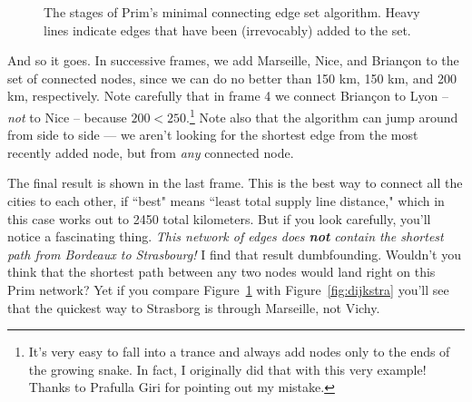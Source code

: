 \begin{figure}[ht]
\begin{custommargins}{-2.4cm}{-2.8cm}

\caption{The stages of Prim's minimal connecting edge set algorithm. Heavy
lines indicate edges that have been (irrevocably) added to the set.}
\label{prim}
\end{custommargins}
\end{figure}

\afterpage{\clearpage}

And so it goes. In successive frames, we add Marseille, Nice, and Brian\c{c}on
to the set of connected nodes, since we can do no better than 150 km, 150 km,
and 200 km, respectively. Note carefully that in frame 4 we connect
Brian\c{c}on to Lyon -- \textit{not} to Nice -- because $200 <
250$.\footnote{It's very easy to fall into a trance and always add nodes only
to the ends of the growing snake. In fact, I originally did that with this very
example! Thanks to Prafulla Giri for pointing out my mistake.} Note also that
the algorithm can jump around from side to side --- we aren't looking for the
shortest edge from the most recently added node, but from \textit{any}
connected node.

The final result is shown in the last frame. This is the best way to connect
all the cities to each other, if ``best" means ``least total supply line
distance," which in this case works out to 2450 total kilometers. But if you
look carefully, you'll notice a fascinating thing. \textit{This network of
edges does \textbf{not} contain the shortest path from Bordeaux to Strasbourg!}
I find that result dumbfounding. Wouldn't you think that the shortest path
between any two nodes would land right on this Prim network? Yet if you compare
Figure~\ref{prim} with Figure~\ref{fig:dijkstra} you'll see that the quickest
way to Strasborg is through Marseille, not Vichy.


